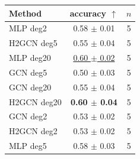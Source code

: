 \begin{tabular}{lcc}
\toprule
Method & accuracy $\uparrow$ & $n$ \\
\midrule
MLP deg2 & 0.58 $\pm$ 0.01 & 5 \\
H2GCN deg5 & 0.55 $\pm$ 0.04 & 5 \\
MLP deg20 & \underline{0.60 $\pm$ 0.02} & 5 \\
GCN deg5 & 0.50 $\pm$ 0.03 & 5 \\
GCN deg20 & 0.55 $\pm$ 0.04 & 5 \\
H2GCN deg20 & \textbf{0.60 $\pm$ 0.04} & 5 \\
GCN deg2 & 0.53 $\pm$ 0.02 & 5 \\
H2GCN deg2 & 0.53 $\pm$ 0.02 & 5 \\
MLP deg5 & 0.58 $\pm$ 0.03 & 5 \\
\bottomrule
\end{tabular}
